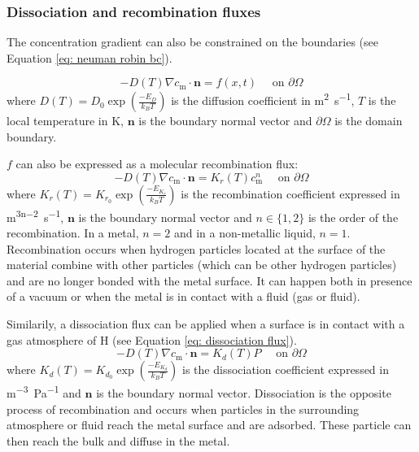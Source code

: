 \subsubsection{Dissociation and recombination fluxes}

The concentration gradient can also be constrained on the boundaries (see Equation \ref{eq: neuman robin bc}).

\begin{equation}
    - D(T)\nabla c_\mathrm{m} \cdot \mathbf{n} = f(x, t) \quad \text { on } \partial \Omega
    \label{eq: neuman robin bc}
\end{equation}
where $D(T) = D_0 \exp(\frac{-E_D}{k_B T}) $ is the diffusion coefficient in \si{m^2.s^{-1}}, $T$ is the local temperature in \si{K}, $\mathbf{n}$ is the boundary normal vector and $\partial \Omega$ is the domain boundary.

$f$ can also be expressed as a molecular recombination flux:
\begin{equation}
    - D(T)\nabla c_\mathrm{m} \cdot \mathbf{n} = K_r(T) c_\mathrm{m}^n \quad \text { on } \partial \Omega
    \label{eq: recombination flux}
\end{equation}
where $K_r(T) = K_{r_0} \exp(\frac{-E_{K_r}}{k_B T}) $ is the recombination coefficient expressed in \si{m^{3n-2}.s^{-1}}, $\mathbf{n}$ is the boundary normal vector and $n \in \{1, 2\}$ is the order of the recombination.
In a metal, $n=2$ and in a non-metallic liquid, $n=1$.
Recombination occurs when hydrogen particles located at the surface of the material combine with other particles (which can be other hydrogen particles) and are no longer bonded with the metal surface.
It can happen both in presence of a vacuum or when the metal is in contact with a fluid (gas or fluid).

Similarily, a dissociation flux can be applied when a surface is in contact with a gas atmosphere of H (see Equation \ref{eq: dissociation flux}).
\begin{equation}
    - D(T)\nabla c_\mathrm{m} \cdot \mathbf{n} = K_d(T) P \quad \text { on } \partial \Omega
    \label{eq: dissociation flux}
\end{equation}
where $K_d(T) = K_{d_0} \exp(\frac{-E_{K_d}}{k_B T}) $ is the dissociation coefficient expressed in \si{m^{-3}.Pa^{-1}} and $\mathbf{n}$ is the boundary normal vector.
Dissociation is the opposite process of recombination and occurs when particles in the surrounding atmosphere or fluid reach the metal surface and are adsorbed.
These particle can then reach the bulk and diffuse in the metal.

